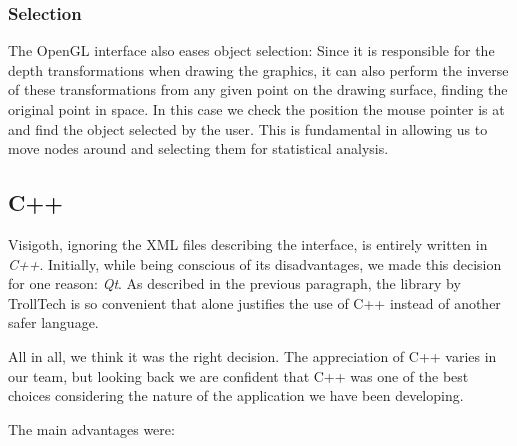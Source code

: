 \documentclass[a4paper,11pt,titlepage]{article}
\newcommand{\buzz}[1]{\emph{#1}}
\begin{document}
\subsubsection{Selection}
The OpenGL interface also eases object selection: Since it is
responsible for the depth transformations when drawing the graphics,
it can also perform the inverse of these transformations from any
given point on the drawing surface, finding the original point
in space. In this case we check the position the mouse pointer is at
and find the object selected by the user. This is fundamental in
allowing us to move nodes around and selecting them for statistical
analysis.

\subsection{C++}

Visigoth, ignoring the XML files describing the interface, is entirely
written in \buzz{C++}. Initially, while being conscious of its disadvantages,
we made this decision for one reason: \buzz{Qt}. As described in the previous
paragraph, the library by TrollTech is so convenient that alone
justifies the use of C++ instead of another safer language.

All in all, we think it was the right decision. The appreciation of
C++ varies in our team, but looking back we are confident that C++ was
one of the best choices considering the nature of the application we
have been developing.

The main advantages were:
\end{document}
